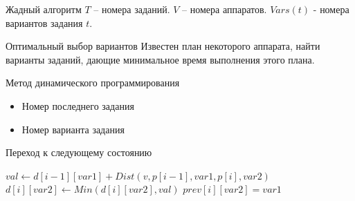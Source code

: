 \documentclass{beamer}
\begin{document}
\begin{frame}{Жадный алгоритм}
$T$ -- номера заданий. $V$ -- номера аппаратов. $Vars(t)$ - номера вариантов задания $t$.

\end{frame}

\begin{frame}{Оптимальный выбор вариантов}
Известен план некоторого аппарата, найти варианты заданий, дающие минимальное время выполнения этого плана.

Метод динамического программирования
\begin{itemize}
\item Номер последнего задания
\item Номер варианта задания
\end{itemize}

\begin{exampleblock}{Переход к следующему состоянию}

\begin{algorithmic}
\State $val \gets d[i - 1][var1] + Dist(v, p[i - 1], var1, p[i], var2)$
    \State $d[i][var2] \gets Min(d[i][var2], val)$
    \State $prev[i][var2] = var1$
\EndIf
\end{algorithmic}

\end{exampleblock}

\end{frame}
\end{document}
